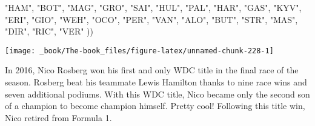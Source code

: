 \documentclass[
]{book}
\newenvironment{Shaded}{\begin{snugshade}}{\end{snugshade}}
\newcommand{\NormalTok}[1]{#1}
\newcommand{\StringTok}[1]{\textcolor[rgb]{0.31,0.60,0.02}{#1}}
\begin{document}
\begin{Shaded}
\begin{Highlighting}[]
                                \StringTok{"HAM"}\NormalTok{, }\StringTok{"BOT"}\NormalTok{,}
                                \StringTok{"MAG"}\NormalTok{, }\StringTok{"GRO"}\NormalTok{,}
                                \StringTok{"SAI"}\NormalTok{, }\StringTok{"HUL"}\NormalTok{, }\StringTok{"PAL"}\NormalTok{,}
                                \StringTok{"HAR"}\NormalTok{, }\StringTok{"GAS"}\NormalTok{, }\StringTok{"KYV"}\NormalTok{,}
                                \StringTok{"ERI"}\NormalTok{, }\StringTok{"GIO"}\NormalTok{, }\StringTok{"WEH"}\NormalTok{,}
                                \StringTok{"OCO"}\NormalTok{, }\StringTok{"PER"}\NormalTok{,  }
                                \StringTok{"VAN"}\NormalTok{, }\StringTok{"ALO"}\NormalTok{, }\StringTok{"BUT"}\NormalTok{,}
                                \StringTok{"STR"}\NormalTok{, }\StringTok{"MAS"}\NormalTok{, }\StringTok{"DIR"}\NormalTok{,}
                                \StringTok{"RIC"}\NormalTok{, }\StringTok{"VER"}
\NormalTok{                                )) }
\end{Highlighting}
\end{Shaded}

\begin{center}\texttt{[image: \_book/The-book\_files/figure-latex/unnamed-chunk-228-1]} \end{center}

In 2016, Nico Rosberg won his first and only WDC title in the final race of the season. Rosberg beat his teammate Lewis Hamilton thanks to nine race wins and seven additional podiums. With this WDC title, Nico became only the second son of a champion to become champion himself. Pretty cool! Following this title win, Nico retired from Formula 1.
\end{document}
